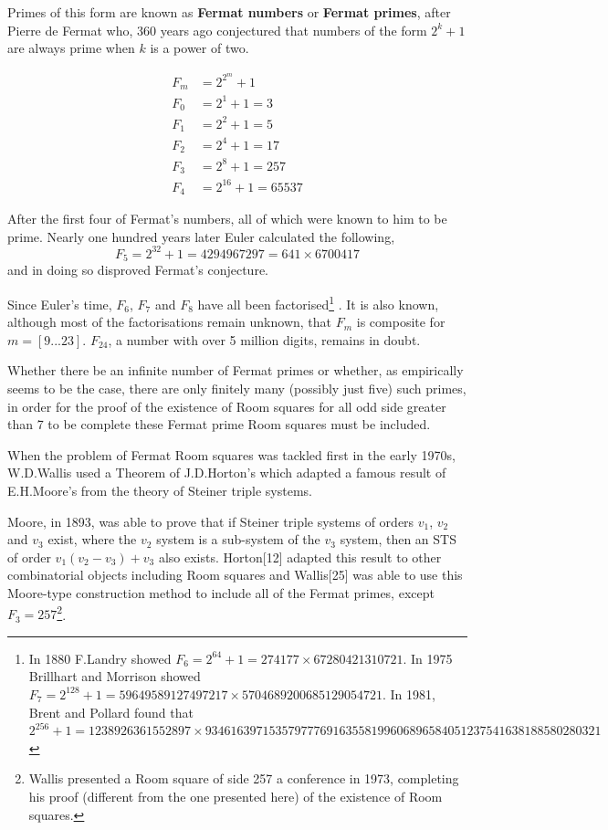 \documentclass[
  11pt,
  a4paper]{book}
\begin{document}
Primes of this form are known as \textbf{Fermat numbers} or
\textbf{Fermat primes}, after Pierre de Fermat who, 360 years ago
conjectured that numbers of the form \(2^k + 1\) are always
prime when \(k\) is a power of two.

\begin{eqnarray*}
  F_m &= 2^{2^m} + 1 \\
  F_0 &= 2^1 + 1 = 3 \\
  F_1 &= 2^2 + 1 = 5 \\
  F_2 &= 2^4 + 1 = 17 \\
  F_3 &= 2^8 + 1 = 257 \\
  F_4 &= 2^{16} + 1 = 65537
\end{eqnarray*}

After the first four of Fermat's numbers, all of which were
known to him to be prime. Nearly one hundred years later
Euler calculated the following,
\[F_5 = 2^{32}+1 = 4294967297 = 641\times 6700417\]
and in doing so disproved Fermat's conjecture.

Since Euler's time, \(F_6\), \(F_7\) and \(F_8\) have all been
factorised\footnote{In 1880 F.Landry showed
  \(F_6=2^{64}+1=274177 \times 67280421310721\). In 1975 Brillhart and
  Morrison showed
  \(F_7=2^{128}+1=59649589127497217 \times 5704689200685129054721\). In
  1981, Brent and Pollard found that\\
  \(2^{256}+1=1238926361552897 \times 93461639715357977769163558199606896584051237541638188580280321\)} . It is also known, although most of the
factorisations remain unknown, that \(F_m\) is composite for
\(m = [9...23]\). \(F_{24}\), a number with over 5 million digits,
remains in doubt.

Whether there be an infinite number of Fermat primes or
whether, as empirically seems to be the case, there are only
finitely many (possibly just five) such primes, in order for
the proof of the existence of Room squares for all odd side
greater than 7 to be complete these Fermat prime Room
squares must be included.

When the problem of Fermat Room squares was tackled first in
the early 1970s, W.D.Wallis used a Theorem of J.D.Horton's
which adapted a famous result of E.H.Moore's from the theory
of Steiner triple systems.

Moore, in 1893, was able to prove that if Steiner triple
systems of orders \(v_1\), \(v_2\) and \(v_3\) exist, where the
\(v_2\) system is a sub-system of the \(v_3\) system, then an
STS of order \(v_1(v_2 - v_3) + v_3\) also exists. Horton{[}12{]}
adapted this result to other combinatorial objects including
Room squares and Wallis{[}25{]} was able to use this Moore-type
construction method to include all of the Fermat primes,
except \(F_3 = 257\)\footnote{Wallis presented a Room square of side 257 a conference in 1973,
  completing his proof (different from the one presented here) of the
  existence of Room squares.}.
\end{document}

